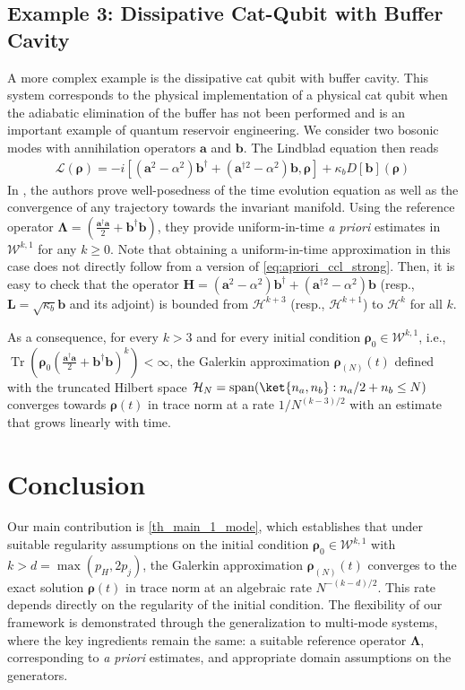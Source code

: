 \documentclass{article}
\newcommand{\xL}{\mathcal{L}}
\newcommand{\xH}{\mathcal{H}}
\newcommand{\xtr}[1]{\operatorname{Tr}\left( #1 \right)}
\newcommand{\xW}{\mathcal{W}}
\newcommand{\rN}{{\boldsymbol{\rho}_{(N)}}}
\let\bf\boldsymbol
\newcommand{\orho}{{\bf \rho}}
\newcommand{\oa}{{\bf a}}
\newcommand{\ob}{{\bf b}}
\newcommand{\oL}{{\bf L}}
\newcommand{\oH}{{\bf H}}
\newcommand{\oLambda}{{\bf \Lambda}}
\begin{document}
\subsection{Example 3: Dissipative Cat-Qubit with Buffer Cavity}
\label{sub_sec:cat_buffer}
A more complex example is the dissipative cat qubit with buffer cavity. This system corresponds to the physical implementation of a physical cat qubit when the adiabatic elimination of the buffer has not been performed and is an important example of quantum reservoir engineering. We consider two bosonic modes with annihilation operators $\oa$ and $\ob$. The Lindblad equation then reads 
\begin{align}
    \xL(\orho)= -i[(\oa^2-\alpha^2)\ob^\dag + (\oa^{\dag 2}-\alpha^2)\ob,\orho]+ \kappa_b D[\ob](\orho)
\end{align}
In \cite{robinConvergenceBipartiteOpen2024}, the authors prove well-posedness of the time evolution equation as well as the convergence of any trajectory towards the invariant manifold. Using the reference operator $\oLambda= (\frac{\oa^\dag \oa}{2}+ \ob^\dag\ob)$, they provide uniform-in-time \textit{a priori} estimates in $\xW^{k,1}$ for any $k \geq 0$. Note that obtaining a uniform-in-time approximation in this case does not directly follow from a version of \cref{eq:apriori_ccl_strong}. Then, it is easy to check that the operator $\oH= (\oa^2-\alpha^2)\ob^\dag + (\oa^{\dag 2}-\alpha^2)\ob$ (resp., $\oL=\sqrt{\kappa_b}\ob$ and its adjoint) is bounded from $\xH^{k+3}$ (resp., $\xH^{k+1}$) to $\xH^k$ for all $k$.

As a consequence, for every $k > 3$ and for every initial condition $\orho_0 \in \xW^{k,1}$, i.e., $\xtr{\orho_0 (\frac{\oa^\dag \oa}{2}+ \ob^\dag\ob)^k}<\infty$, the Galerkin approximation $\rN(t)$ defined with the truncated Hilbert space $\xH_N=\text{span}(\ket{n_a,n_b}: n_a/2+n_b \leq N)$ converges towards $\orho(t)$ in trace norm at a rate $1/N^{(k-3)/2}$ with an estimate that grows linearly with time.
\section{Conclusion}
\label{sec:conclusion}

Our main contribution is \cref{th_main_1_mode}, which establishes that under suitable regularity assumptions on the initial condition $\orho_0 \in \xW^{k,1}$ with $k > d = \max(p_H, 2p_j)$, the Galerkin approximation $\rN(t)$ converges to the exact solution $\orho(t)$ in trace norm at an algebraic rate $N^{-(k-d)/2}$. This rate depends directly on the regularity of the initial condition. The flexibility of our framework is demonstrated through the generalization to multi-mode systems, where the key ingredients remain the same: a suitable reference operator $\oLambda$, corresponding to \textit{a priori} estimates, and appropriate domain assumptions on the generators.
\end{document}
